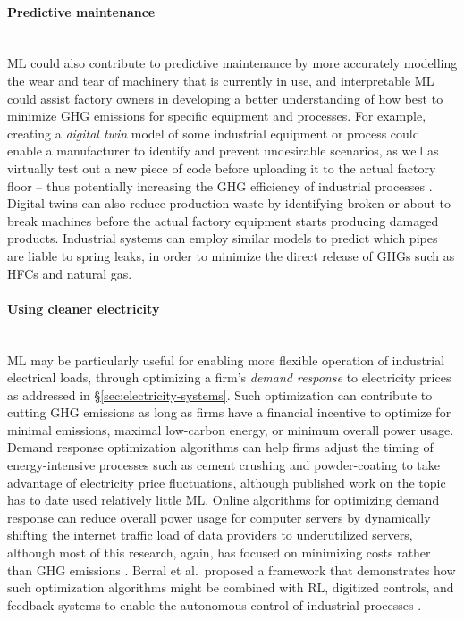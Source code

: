 \documentclass[11pt]{report}
\newcommand{\Gap}{\texorpdfstring{\hfill}{}}
\newcommand{\Rec}{\texorpdfstring{{\small\emph{\color{blue}{\fbox{High Leverage}}}}}{}}
\begin{document}
\paragraph*{Predictive maintenance} \Gap\mbox{}\\\label{sec:predictive}ML could also contribute to predictive maintenance by more accurately modelling the wear and tear of machinery that is currently in use, and interpretable ML could assist factory owners in developing a better understanding of how best to minimize GHG emissions for specific equipment and processes. For example, creating a \emph{digital twin} model of some industrial equipment or process could enable a manufacturer to identify and prevent undesirable scenarios, as well as virtually test out a new piece of code before uploading it to the actual factory floor -- thus potentially increasing the GHG efficiency of industrial processes \cite{Glaessgen2012, Tao2018}. Digital twins can also reduce production waste by identifying broken or about-to-break machines before the actual factory equipment starts producing damaged products. Industrial systems can employ similar models to predict which pipes are liable to spring leaks, in order to minimize the direct release of GHGs such as HFCs and natural gas.


\paragraph*{Using cleaner electricity}\Gap \Rec\mbox{}\\\label{sec:electritydemand}ML may be particularly useful for enabling more flexible operation of industrial electrical loads, through optimizing a firm's \emph{demand response} to electricity prices as addressed in \S\ref{sec:electricity-systems}. Such optimization can contribute to cutting GHG emissions as long as firms have a financial incentive to optimize for minimal emissions, maximal low-carbon energy, or minimum overall power usage. Demand response optimization algorithms can help firms adjust the timing of energy-intensive processes such as cement crushing \cite{Zhang2016} and powder-coating \cite{Rockwell} to take advantage of electricity price fluctuations, although published work on the topic has to date used relatively little ML. Online algorithms for optimizing demand response can reduce overall power usage for computer servers by dynamically shifting the internet traffic load of data providers to underutilized servers, although most of this research, again, has focused on minimizing costs rather than GHG emissions \cite{buchbinder2011online, Horner2016}. Berral et al.~proposed a framework that demonstrates how such optimization algorithms might be combined with RL, digitized controls, and feedback systems to enable the autonomous control of industrial processes \cite{Berral2010}.
\end{document}
